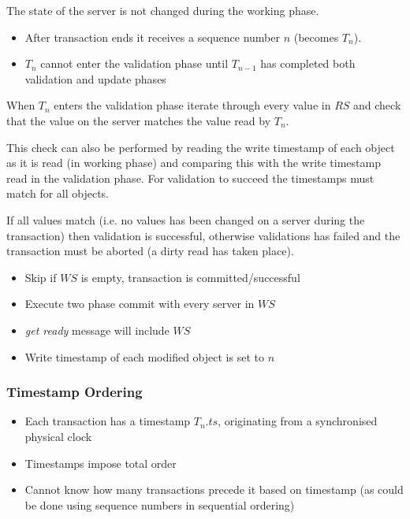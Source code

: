 \documentclass[a4paper]{article}
\begin{document}
The state of the server is not changed during the working phase.


\begin{itemize}
  \item After transaction ends it receives a sequence number $n$ (becomes $T_{n}$).
  \item $T_{n}$ cannot enter the validation phase until $T_{n-1}$ has completed
        both validation and update phases
\end{itemize}

When $T_{n}$ enters the validation phase iterate through every value in $RS$ and
check that the value on the server matches the value read by $T_{n}$.

This check can also be performed by reading the write timestamp of each object
as it is read (in working phase) and comparing this with the write timestamp
read in the validation phase. For validation to succeed the timestamps must
match for all objects.

If all values match (i.e. no values has been changed on a server during the
transaction) then validation is successful, otherwise validations has failed and
the transaction must be aborted (a dirty read has taken place).


\begin{itemize}
  \item Skip if $WS$ is empty, transaction is committed/successful
  \item Execute two phase commit with every server in $WS$
  \item \textit{get ready} message will include $WS$
  \item Write timestamp of each modified object is set to $n$
\end{itemize}

\subsubsection{Timestamp Ordering}

\begin{itemize}
  \item Each transaction has a timestamp $T_{n}.ts$, originating from a
        synchronised physical clock
  \item Timestamps impose total order
  \item Cannot know how many transactions precede it based on timestamp (as
        could be done using sequence numbers in sequential ordering)
\end{itemize}
\end{document}
